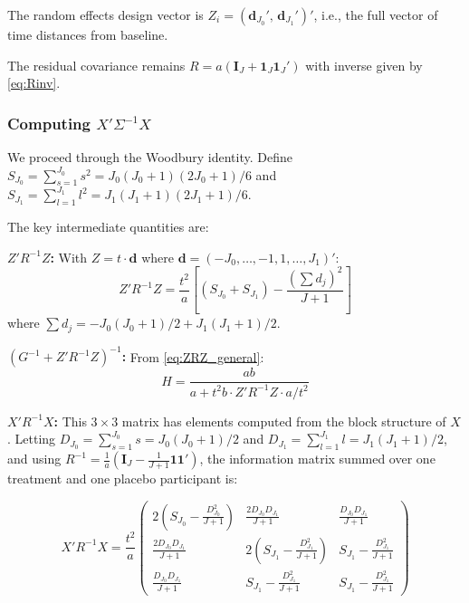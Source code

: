 \documentclass[
  11pt,
]{article}
\begin{document}
The random effects design vector is
\(Z_i = (\mathbf{d}_{J_0}',\, \mathbf{d}_{J_1}')'\), i.e., the full
vector of time distances from baseline.

The residual covariance remains \(R = a(\mathbf{I}_J +
\mathbf{1}_J\mathbf{1}_J')\) with inverse given by \eqref{eq:Rinv}.

\subsubsection{\texorpdfstring{Computing
\(X'\Sigma^{-1}X\)}{Computing X\textquotesingle\textbackslash Sigma\^{}\{-1\}X}}\label{computing-xsigma-1x}

We proceed through the Woodbury identity. Define
\(S_{J_0} = \sum_{s=1}^{J_0} s^2 = J_0(J_0+1)(2J_0+1)/6\) and
\(S_{J_1} = \sum_{l=1}^{J_1} l^2 = J_1(J_1+1)(2J_1+1)/6\).

The key intermediate quantities are:

\textbf{\(Z'R^{-1}Z\):} With \(Z = t \cdot \mathbf{d}\) where
\(\mathbf{d} = (-J_0,\ldots,-1,1,\ldots,J_1)'\): \begin{equation}
  Z'R^{-1}Z = \frac{t^2}{a}\left[
    (S_{J_0} + S_{J_1})
    - \frac{(\sum d_j)^2}{J+1}
  \right]
  \label{eq:ZRZ_general}
\end{equation} where \(\sum d_j = -J_0(J_0+1)/2 + J_1(J_1+1)/2\).

\textbf{\((G^{-1} + Z'R^{-1}Z)^{-1}\):} From \eqref{eq:ZRZ_general}: \[
  H = \frac{ab}{a + t^2 b \cdot Z'R^{-1}Z \cdot a/t^2}
\]

\textbf{\(X'R^{-1}X\):} This \(3 \times 3\) matrix has elements computed
from the block structure of \(X\). Letting
\(D_{J_0} = \sum_{s=1}^{J_0} s = J_0(J_0+1)/2\) and
\(D_{J_1} = \sum_{l=1}^{J_1} l = J_1(J_1+1)/2\), and using
\(R^{-1} = \frac{1}{a}(\mathbf{I}_J -
\frac{1}{J+1}\mathbf{1}\mathbf{1}')\), the information matrix summed
over one treatment and one placebo participant is:

\begin{equation}
  X'R^{-1}X = \frac{t^2}{a}\begin{pmatrix}
    2\!\left(S_{J_0} - \frac{D_{J_0}^2}{J+1}\right) &
    \frac{2D_{J_0} D_{J_1}}{J+1} &
    \frac{D_{J_0} D_{J_1}}{J+1} \\[4pt]
    \frac{2D_{J_0} D_{J_1}}{J+1} &
    2\!\left(S_{J_1} - \frac{D_{J_1}^2}{J+1}\right) &
    S_{J_1} - \frac{D_{J_1}^2}{J+1} \\[4pt]
    \frac{D_{J_0} D_{J_1}}{J+1} &
    S_{J_1} - \frac{D_{J_1}^2}{J+1} &
    S_{J_1} - \frac{D_{J_1}^2}{J+1}
  \end{pmatrix}
  \label{eq:XRX_general}
\end{equation}
\end{document}
